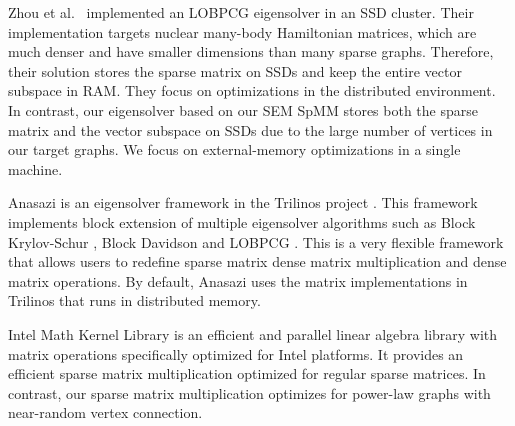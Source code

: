 Zhou et al.~\cite{Zhou12} implemented an LOBPCG \cite{Arbenz05} eigensolver in
an SSD cluster. Their implementation targets nuclear many-body Hamiltonian
matrices, which are much denser and have smaller dimensions than many sparse
graphs. Therefore, their solution stores the sparse matrix on SSDs and keep
the entire vector subspace in RAM. They focus on optimizations
in the distributed environment. In contrast, our eigensolver based on our
SEM SpMM stores both
the sparse matrix and the vector subspace on SSDs due to the large number
of vertices in our target graphs. We focus on external-memory optimizations
in a single machine.

Anasazi \cite{anasazi} is an eigensolver framework in the Trilinos project
\cite{trilinos}. This framework implements block extension of multiple
eigensolver algorithms such as Block Krylov-Schur \cite{krylovschur},
Block Davidson \cite{Arbenz05} and LOBPCG \cite{Arbenz05}.
This is a very flexible framework
that allows users to redefine sparse matrix dense matrix multiplication and
dense matrix operations. By default, Anasazi uses the matrix implementations
in Trilinos that runs in distributed memory.

Intel Math Kernel Library \cite{mkl} is an efficient and parallel linear
algebra library with matrix operations specifically optimized for Intel
platforms. It provides an efficient sparse matrix multiplication optimized
for regular sparse matrices. In contrast, our sparse matrix multiplication
optimizes for power-law graphs with near-random vertex connection.
